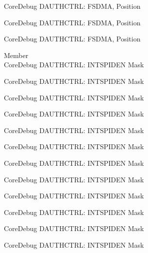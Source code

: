 \begin{DoxyRefList}
\label{deprecated__deprecated000742}%
%
Core\+Debug DAUTHCTRL\+: FSDMA, Position 

\label{deprecated__deprecated001193}%
%
Core\+Debug DAUTHCTRL\+: FSDMA, Position 

\label{deprecated__deprecated001295}%
%
Core\+Debug DAUTHCTRL\+: FSDMA, Position  
\item[Member \doxylink{group___c_m_s_i_s___s_c_b_ga1570f149a0f89f70fc2644a5842cbcb4}{Core\+Debug\+\_\+\+DAUTHCTRL\+\_\+\+INTSPIDEN\+\_\+\+Msk} ]\hfill \\
\label{deprecated__deprecated000090}%
%
Core\+Debug DAUTHCTRL\+: INTSPIDEN Mask 

\label{deprecated__deprecated000144}%
%
Core\+Debug DAUTHCTRL\+: INTSPIDEN Mask 

\label{deprecated__deprecated000220}%
%
Core\+Debug DAUTHCTRL\+: INTSPIDEN Mask 

\label{deprecated__deprecated000283}%
%
Core\+Debug DAUTHCTRL\+: INTSPIDEN Mask 

\label{deprecated__deprecated000362}%
%
Core\+Debug DAUTHCTRL\+: INTSPIDEN Mask 

\label{deprecated__deprecated000438}%
%
Core\+Debug DAUTHCTRL\+: INTSPIDEN Mask 

\label{deprecated__deprecated000541}%
%
Core\+Debug DAUTHCTRL\+: INTSPIDEN Mask 

\label{deprecated__deprecated000643}%
%
Core\+Debug DAUTHCTRL\+: INTSPIDEN Mask 

\label{deprecated__deprecated000749}%
%
Core\+Debug DAUTHCTRL\+: INTSPIDEN Mask 

\label{deprecated__deprecated000803}%
%
Core\+Debug DAUTHCTRL\+: INTSPIDEN Mask 

\label{deprecated__deprecated000879}%
%
Core\+Debug DAUTHCTRL\+: INTSPIDEN Mask 

\label{deprecated__deprecated000942}%
%
Core\+Debug DAUTHCTRL\+: INTSPIDEN Mask 


\end{DoxyRefList}
